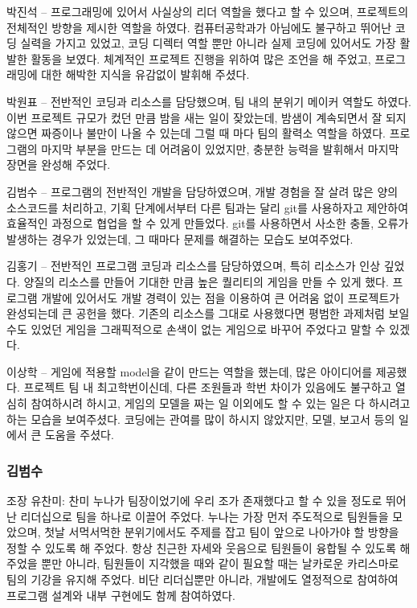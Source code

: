 \documentclass[10pt,oneside,a4paper,titlepage]{article}
\begin{document}
박진석 – 프로그래밍에 있어서 사실상의 리더 역할을 했다고 할 수 있으며, 프로젝트의 전체적인 방향을 제시한 역할을 하였다. 컴퓨터공학과가 아님에도 불구하고 뛰어난 코딩 실력을 가지고 있었고, 코딩 디렉터 역할 뿐만 아니라 실제 코딩에 있어서도 가장 활발한 활동을 보였다. 체계적인 프로젝트 진행을 위하여 많은 조언을 해 주었고, 프로그래밍에 대한 해박한 지식을 유감없이 발휘해 주셨다.

박원표 – 전반적인 코딩과 리소스를 담당했으며, 팀 내의 분위기 메이커 역할도 하였다. 이번 프로젝트 규모가 컸던 만큼 밤을 새는 일이 잦았는데, 밤샘이 계속되면서 잘 되지 않으면 짜증이나 불만이 나올 수 있는데 그럴 때 마다 팀의 활력소 역할을 하였다. 프로그램의 마지막 부분을 만드는 데 어려움이 있었지만, 충분한 능력을 발휘해서 마지막 장면을 완성해 주었다.

김범수 – 프로그램의 전반적인 개발을 담당하였으며, 개발 경험을 잘 살려 많은 양의 소스코드를 처리하고, 기획 단계에서부터 다른 팀과는 달리 git를 사용하자고 제안하여 효율적인 과정으로 협업을 할 수 있게 만들었다. git를 사용하면서 사소한 충돌, 오류가 발생하는 경우가 있었는데, 그 때마다 문제를 해결하는 모습도 보여주었다.

김홍기 – 전반적인 프로그램 코딩과 리소스를 담당하였으며, 특히 리소스가 인상 깊었다. 양질의 리소스를 만들어 기대한 만큼 높은 퀄리티의 게임을 만들 수 있게 했다. 프로그램 개발에 있어서도 개발 경력이 있는 점을 이용하여 큰 어려움 없이 프로젝트가 완성되는데 큰 공헌을 했다. 기존의 리소스를 그대로 사용했다면 평범한 과제처럼 보일 수도 있었던 게임을 그래픽적으로 손색이 없는 게임으로 바꾸어 주었다고 말할 수 있겠다.

이상학 – 게임에 적용할 model을 같이 만드는 역할을 했는데, 많은 아이디어를 제공했다. 프로젝트 팀 내 최고학번이신데, 다른 조원들과 학번 차이가 있음에도 불구하고 열심히 참여하시려 하시고, 게임의 모델을 짜는 일 이외에도 할 수 있는 일은 다 하시려고 하는 모습을 보여주셨다. 코딩에는 관여를 많이 하시지 않았지만, 모델, 보고서 등의 일에서 큰 도움을 주셨다.

\subsubsection{김범수}
조장 유찬미:
찬미 누나가 팀장이었기에 우리 조가 존재했다고 할 수 있을 정도로 뛰어난 리더십으로 팀을 하나로 이끌어 주었다. 누나는 가장 먼저 주도적으로 팀원들을 모았으며, 첫날 서먹서먹한 분위기에서도 주제를 잡고 팀이 앞으로 나아가야 할 방향을 정할 수 있도록 해 주었다. 항상 친근한 자세와 웃음으로 팀원들이 융합될 수 있도록 해 주었을 뿐만 아니라, 팀원들이 지각했을 때와 같이 필요할 때는 날카로운 카리스마로 팀의 기강을 유지해 주었다. 비단 리더십뿐만 아니라, 개발에도 열정적으로 참여하여 프로그램 설계와 내부 구현에도 함께 참여하였다.
\end{document}
